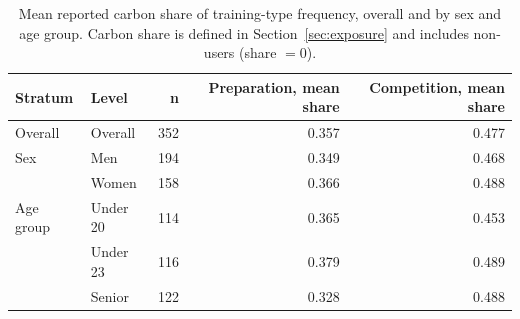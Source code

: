 \begin{table}[htbp]
\centering
\caption{Mean reported carbon share of training-type frequency, overall and by sex and age group. Carbon share is defined in Section~\ref{sec:exposure} and includes non-users (share $=0$).}
\label{tab:descriptive-carbon}
\begin{tabular}{llrrr}
\toprule
Stratum & Level & n & Preparation, mean share & Competition, mean share \\
\midrule
Overall & Overall & 352 & 0.357 & 0.477 \\
Sex & Men & 194 & 0.349 & 0.468 \\
 & Women & 158 & 0.366 & 0.488 \\
Age group & Under 20 & 114 & 0.365 & 0.453 \\
 & Under 23 & 116 & 0.379 & 0.489 \\
 & Senior & 122 & 0.328 & 0.488 \\
\bottomrule
\end{tabular}
\end{table}
